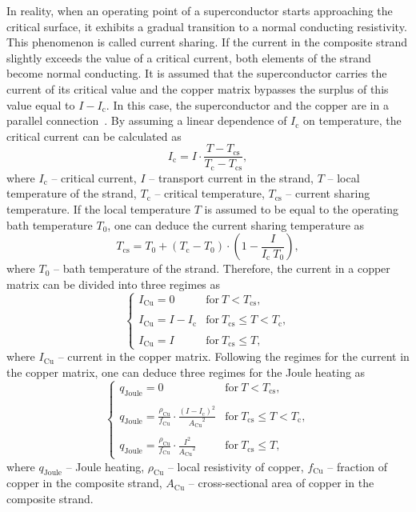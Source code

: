 In reality, when an operating point of a superconductor starts approaching the critical surface, it exhibits a gradual transition to a normal conducting resistivity. This phenomenon is called current sharing. If the current in the composite strand slightly exceeds the value of a critical current, both elements of the strand become normal conducting. It is assumed that the superconductor carries the current of its critical value and the copper matrix bypasses the surplus of this value equal to $I-I_\text{c}$. In this case, the superconductor and the copper are in a parallel connection~\cite[p.~119-121]{superconducting_accelerator_magnets}. By assuming a linear dependence of $I_\text{c}$ on temperature, the critical current can be calculated as 
\begin{equation}
    I_\text{c} = I \cdot \frac{T-T_\text{cs}}{T_\text{c}-T_\text{cs}},
\end{equation}
where $I_\text{c}$ -- critical current, $I$ -- transport current in the strand, $T$ -- local temperature of the strand, $T_\text{c}$ -- critical temperature, $T_\text{cs}$ -- current sharing temperature. If the local temperature $T$ is assumed to be equal to the operating bath temperature $T_0$, one can deduce the current sharing temperature as
\begin{equation}
    T_\text{cs} = T_\text{0} + (T_\text{c} - T_\text{0}) \cdot (1 - \frac{I}{I_\text{c}~T_0}),
\end{equation}
where $T_0$ -- bath temperature of the strand. Therefore, the current in a copper matrix can be divided into three regimes as
\begin{equation}
    \left\{ \begin{array}{ lll }
    I_\text{Cu} = 0 & \text{for}~T < T_\text{cs}, \\ \\
    I_\text{Cu} = I - I_\text{c} & \text{for}~T_\text{cs} \leq T<T_\text{c},  \\ \\
    I_\text{Cu} = I & \text{for}~T_\text{cs} \leq T,
    \end{array} \right.
\end{equation}
where $I_\text{Cu}$ -- current in the copper matrix. Following the regimes for the current in the copper matrix, one can deduce three regimes for the Joule heating as
\begin{equation}
    \left\{ \begin{array}{lll}
    q_\text{Joule} = 0 & \text{for}~T < T_\text{cs}, \\ \\
    q_\text{Joule} = \frac{\rho_\text{Cu}}{f_\text{Cu}} \cdot \frac{(I-I_\text{c})^2}{{A_\text{Cu}}^2}& \text{for}~T_\text{cs} \leq T<T_\text{c},  \\ \\
    q_\text{Joule} = \frac{\rho_\text{Cu}}{f_\text{Cu}} \cdot \frac{I^2}{{A_\text{Cu}}^2} & \text{for}~T_\text{cs} \leq T,
    \end{array} \right.
\end{equation}
where $q_\text{Joule}$ -- Joule heating, $\rho_\text{Cu}$ -- local resistivity of copper, $f_\text{Cu}$ -- fraction of copper in the composite strand, $A_\text{Cu}$ -- cross-sectional area of copper in the composite strand.

